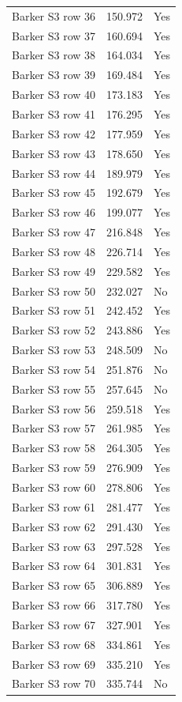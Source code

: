 {\begin{longtable}{lrl}
Barker S3 row 36 & 150.972 & Yes \\
Barker S3 row 37 & 160.694 & Yes \\
Barker S3 row 38 & 164.034 & Yes \\
Barker S3 row 39 & 169.484 & Yes \\
Barker S3 row 40 & 173.183 & Yes \\
Barker S3 row 41 & 176.295 & Yes \\
Barker S3 row 42 & 177.959 & Yes \\
Barker S3 row 43 & 178.650 & Yes \\
Barker S3 row 44 & 189.979 & Yes \\
Barker S3 row 45 & 192.679 & Yes \\
Barker S3 row 46 & 199.077 & Yes \\
Barker S3 row 47 & 216.848 & Yes \\
Barker S3 row 48 & 226.714 & Yes \\
Barker S3 row 49 & 229.582 & Yes \\
Barker S3 row 50 & 232.027 & No \\
Barker S3 row 51 & 242.452 & Yes \\
Barker S3 row 52 & 243.886 & Yes \\
Barker S3 row 53 & 248.509 & No \\
Barker S3 row 54 & 251.876 & No \\
Barker S3 row 55 & 257.645 & No \\
Barker S3 row 56 & 259.518 & Yes \\
Barker S3 row 57 & 261.985 & Yes \\
Barker S3 row 58 & 264.305 & Yes \\
Barker S3 row 59 & 276.909 & Yes \\
Barker S3 row 60 & 278.806 & Yes \\
Barker S3 row 61 & 281.477 & Yes \\
Barker S3 row 62 & 291.430 & Yes \\
Barker S3 row 63 & 297.528 & Yes \\
Barker S3 row 64 & 301.831 & Yes \\
Barker S3 row 65 & 306.889 & Yes \\
Barker S3 row 66 & 317.780 & Yes \\
Barker S3 row 67 & 327.901 & Yes \\
Barker S3 row 68 & 334.861 & Yes \\
Barker S3 row 69 & 335.210 & Yes \\
Barker S3 row 70 & 335.744 & No \\

\end{longtable}}
